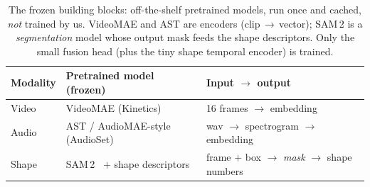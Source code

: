 \documentclass[11pt]{article}
\begin{document}
\begin{table}[h]
\centering\small
\begin{tabular}{@{}lll@{}}
\toprule
Modality & Pretrained model (frozen) & Input $\rightarrow$ output \\
\midrule
Video & VideoMAE (Kinetics)              & 16 frames $\rightarrow$ embedding \\
Audio & AST / AudioMAE-style (AudioSet)  & wav $\rightarrow$ spectrogram $\rightarrow$ embedding \\
Shape & SAM\,2~\cite{sam2} $+$ shape descriptors & frame $+$ box $\rightarrow$ \emph{mask} $\rightarrow$ shape numbers \\
\bottomrule
\end{tabular}
\caption{The frozen building blocks: off-the-shelf pretrained models, run once and cached, \emph{not} trained by us. VideoMAE and AST are encoders (clip\,$\rightarrow$\,vector); SAM\,2 is a \emph{segmentation} model whose output mask feeds the shape descriptors. Only the small fusion head (plus the tiny shape temporal encoder) is trained.}
\label{tab:frozen}
\end{table}
\end{document}
